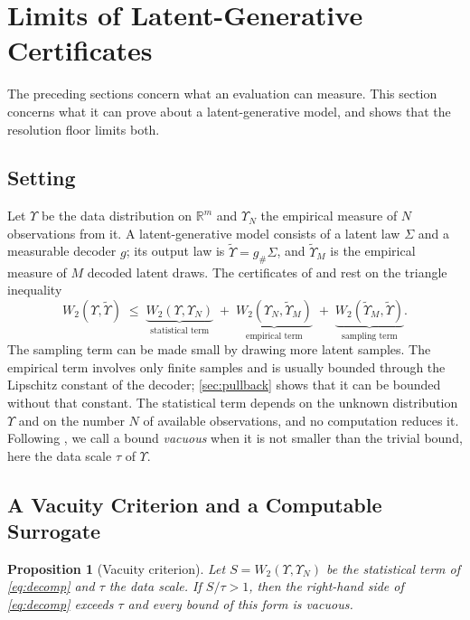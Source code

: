 \documentclass[twoside,11pt]{article}
\theoremstyle{plain}
\newtheorem{prop}{Proposition}
\theoremstyle{definition}
\theoremstyle{remark}
\newcommand{\Wtwo}{\ensuremath{W_2}}
\newcommand{\Ups}{\ensuremath{\Upsilon}}
\newcommand{\UpsN}{\ensuremath{\Upsilon_{N}}}
\newcommand{\UpsT}{\ensuremath{\tilde{\Upsilon}}}
\newcommand{\UpsTM}{\ensuremath{\tilde{\Upsilon}_{M}}}
\newcommand{\R}{\ensuremath{\mathbb{R}}}
\begin{document}
\section{Limits of Latent-Generative Certificates}\label{sec:cert}

The preceding sections concern what an evaluation can measure. This section
concerns what it can prove about a latent-generative model, and shows that
the resolution floor limits both.

\subsection{Setting}\label{sec:cert-setting}

Let $\Ups$ be the data distribution on $\R^m$ and $\UpsN$ the empirical
measure of $N$ observations from it. A latent-generative model consists of a
latent law $\Sigma$ and a measurable decoder $g$; its output law is
$\UpsT = g_{\#}\Sigma$, and $\UpsTM$ is the empirical measure of $M$ decoded
latent draws. The certificates of \citet{dao2023} and \citet{lee2025} rest on
the triangle inequality
\begin{equation}\label{eq:decomp}
  \Wtwo(\Ups, \UpsT) \;\leq\;
  \underbrace{\Wtwo(\Ups, \UpsN)}_{\text{statistical term}} \;+\;
  \underbrace{\Wtwo(\UpsN, \UpsTM)}_{\text{empirical term}} \;+\;
  \underbrace{\Wtwo(\UpsTM, \UpsT)}_{\text{sampling term}} .
\end{equation}
The sampling term can be made small by drawing more latent samples. The
empirical term involves only finite samples and is usually bounded through
the Lipschitz constant of the decoder; \cref{sec:pullback} shows that it can be
bounded without that constant. The statistical term depends on the unknown
distribution $\Ups$ and on the number $N$ of available observations, and no
computation reduces it. Following \citet{dziugaite2017}, we call a bound
\emph{vacuous} when it is not smaller than the trivial bound, here the data
scale $\tau$ of $\Ups$.

\subsection{A Vacuity Criterion and a Computable Surrogate}\label{sec:cert-surrogate}

\begin{prop}[Vacuity criterion]\label{prop:vacuity}
Let $S = \Wtwo(\Ups, \UpsN)$ be the statistical term of \cref{eq:decomp}
and $\tau$ the data scale. If $S/\tau > 1$, then the right-hand side of
\cref{eq:decomp} exceeds $\tau$ and every bound of this form is vacuous.
\end{prop}
\end{document}
